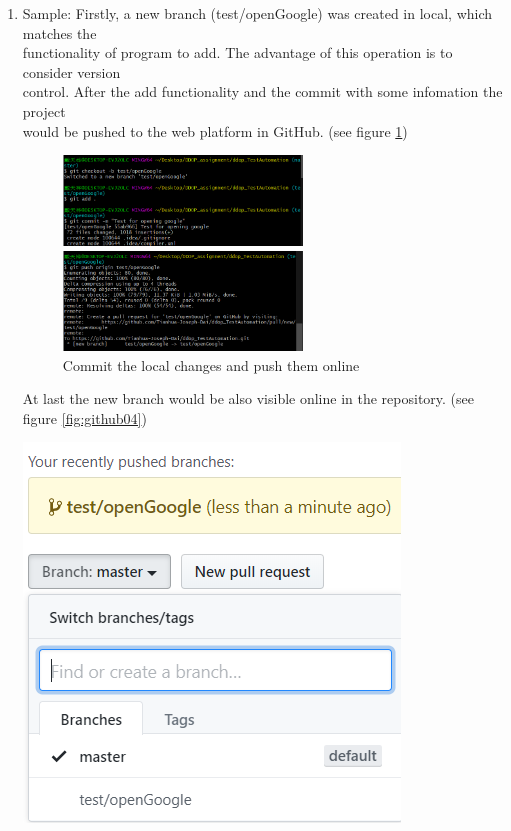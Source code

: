 \documentclass[12pt,a4paper,bibliography=totocnumbered,listof=totocnumbered]{article}
\begin{document}
\begin{enumerate}
\begin{minipage}{\linewidth}
		[Pic Git Clone]{Clone into the local folder}
		\label{fig:github02}
	\end{minipage}
	\item Sample: Firstly, a new branch (test/openGoogle) was created in local, which matches the\\ functionality of program to add. The advantage of this operation is to consider version\\ control. After the add functionality and the commit with some infomation the project\\ would be pushed to the web platform in GitHub. (see figure \ref{fig:github03})
	\begin{figure}[H] 
		\begin{minipage}[t]{0.5\linewidth} 
		\centering 
		\includegraphics[width=2.5in]{pics/gitAdd.png}  
		\end{minipage}%
		\begin{minipage}[t]{0.5\linewidth} 
		\centering 
		\includegraphics[width=2.5in]{pics/gitPush.png} 
		\end{minipage} %
		\caption{Commit the local changes and push them online}
		\label{fig:github03}
	\end{figure}
	At last the new branch would be also visible online in the repository. (see figure \ref{fig:github04})
	\newline
	\begin{minipage}{\linewidth}
		\centering
		\includegraphics[width=0.5\linewidth]{pics/newBranchOnline.png}

\end{minipage}
\end{enumerate}
\end{document}
